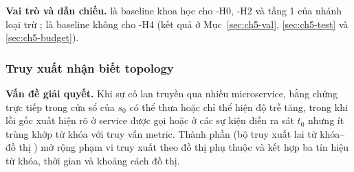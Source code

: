 \textbf{Vai trò và dẫn chiếu.}  là baseline khoa học cho \hyp{H0}, \hyp{H2} và tầng 1 của nhánh loại trừ ;  là baseline không  cho \hyp{H4} (kết quả ở Mục~\ref{sec:ch5-val}, \ref{sec:ch5-test} và \ref{sec:ch5-budget}).

\subsubsection{Truy xuất nhận biết topology }
\label{sec:ch4-c1}

\textbf{Vấn đề giải quyết.} Khi sự cố lan truyền qua nhiều microservice, bằng chứng trực tiếp trong cửa sổ của $s_0$ có thể thưa hoặc chỉ thể hiện độ trễ tăng, trong khi lỗi gốc xuất hiện rõ ở service được gọi hoặc ở các sự kiện diễn ra sát $t_0$ nhưng ít trùng khớp từ khóa với truy vấn metric. Thành phần \textbf{} (bộ truy xuất lai từ khóa--đồ thị ) mở rộng phạm vi truy xuất theo đồ thị phụ thuộc và kết hợp ba tín hiệu từ khóa, thời gian và khoảng cách đồ thị.


